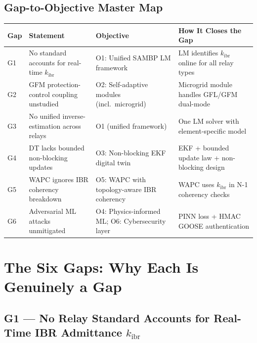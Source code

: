 \documentclass[12pt,a4paper]{article}
\newcommand{\kibr}{k_\mathrm{ibr}}
\begin{document}
\subsection{Gap-to-Objective Master Map}

\begin{center}
\small
\begin{tabular}{@{}lp{4.5cm}lp{4.5cm}@{}}
\toprule
\textbf{Gap} & \textbf{Statement} & \textbf{Objective} & \textbf{How It Closes the Gap} \\
\midrule
G1 & No standard accounts for real-time $\kibr$
   & O1: Unified SAMBP LM framework
   & LM identifies $\kibr$ online for all relay types \\[4pt]
G2 & GFM protection-control coupling unstudied
   & O2: Self-adaptive modules (incl.\ microgrid)
   & Microgrid module handles GFL/GFM dual-mode \\[4pt]
G3 & No unified inverse-estimation across relays
   & O1 (unified framework)
   & One LM solver with element-specific model \\[4pt]
G4 & DT lacks bounded non-blocking updates
   & O3: Non-blocking EKF digital twin
   & EKF + bounded update law + non-blocking design \\[4pt]
G5 & WAPC ignores IBR coherency breakdown
   & O5: WAPC with topology-aware IBR coherency
   & WAPC uses $\kibr$ in N-1 coherency checks \\[4pt]
G6 & Adversarial ML attacks unmitigated
   & O4: Physics-informed ML; O6: Cybersecurity layer
   & PINN loss + HMAC GOOSE authentication \\
\bottomrule
\end{tabular}
\end{center}

\section{The Six Gaps: Why Each Is Genuinely a Gap}

\subsection{G1 --- No Relay Standard Accounts for Real-Time IBR Admittance $\kibr$}
\end{document}
